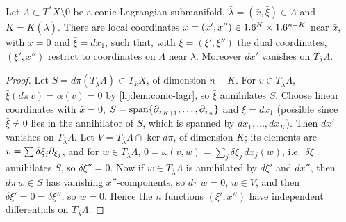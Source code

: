 \begin{lemma}\label{hj:lem:adapted}
  Let $\Lambda\subset T^*X\setminus0$ be a conic Lagrangian submanifold,
  $\bar\lambda=(\bar x,\bar\xi)\in\Lambda$ and $K=K(\bar\lambda)$.  There are
  local coordinates $x=(x',x'')\in1.6^K\times1.6^{n-K}$ near $\bar x$, with
  $\bar x=0$ and $\bar\xi=dx_1$, such that, with $\xi=(\xi',\xi'')$ the dual
  coordinates, $(\xi',x'')$ restrict to coordinates on $\Lambda$ near
  $\bar\lambda$.  Moreover $dx'$ vanishes on $T_{\bar\lambda}\Lambda$.
\end{lemma}
\begin{proof}
  Let $S=d\pi(T_{\bar\lambda}\Lambda)\subset T_{\bar x}X$, of dimension $n-K$.
  For $v\in T_{\bar\lambda}\Lambda$, $\bar\xi(d\pi\,v)=\alpha(v)=0$ by
  \cref{hj:lem:conic-lagr}, so $\bar\xi$ annihilates $S$.  Choose linear
  coordinates with $\bar x=0$, $S=\operatorname{span}\{\partial_{x_{K+1}},\dots,
  \partial_{x_n}\}$ and $\bar\xi=dx_1$ (possible since $\bar\xi\neq0$ lies in the
  annihilator of $S$, which is spanned by $dx_1,\dots,dx_K$).  Then $dx'$ vanishes
  on $T_{\bar\lambda}\Lambda$.  Let $V=T_{\bar\lambda}\Lambda\cap\ker d\pi$, of
  dimension $K$; its elements are $v=\sum\delta\xi_j\partial_{\xi_j}$, and for
  $w\in T_{\bar\lambda}\Lambda$, $0=\omega(v,w)=\sum_j\delta\xi_j\,dx_j(w)$, i.e.\
  $\delta\xi$ annihilates $S$, so $\delta\xi''=0$.  Now if $w\in
  T_{\bar\lambda}\Lambda$ is annihilated by $d\xi'$ and $dx''$, then $d\pi\,w\in
  S$ has vanishing $x''$-components, so $d\pi\,w=0$, $w\in V$, and then
  $\delta\xi'=0=\delta\xi''$, so $w=0$.  Hence the $n$ functions $(\xi',x'')$ have
  independent differentials on $T_{\bar\lambda}\Lambda$.
\end{proof}

